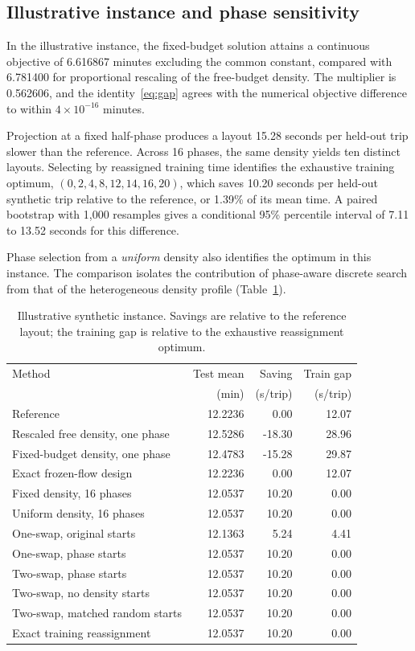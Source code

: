 \documentclass[11pt]{article}
\theoremstyle{remark}\newtheorem{remark}[theorem]{Remark}
\begin{document}
\subsection{Illustrative instance and phase sensitivity}
In the illustrative instance, the fixed-budget solution attains a continuous objective of 6.616867 minutes excluding the common constant, compared with 6.781400 for proportional rescaling of the free-budget density. The multiplier is 0.562606, and the identity~\eqref{eq:gap} agrees with the numerical objective difference to within $4\times10^{-16}$ minutes.

Projection at a fixed half-phase produces a layout 15.28 seconds per held-out trip slower than the reference. Across 16 phases, the same density yields ten distinct layouts. Selecting by reassigned training time identifies the exhaustive training optimum, $(0,2,4,8,12,14,16,20)$, which saves 10.20 seconds per held-out synthetic trip relative to the reference, or 1.39\% of its mean time. A paired bootstrap with 1,000 resamples gives a conditional 95\% percentile interval of 7.11 to 13.52 seconds for this difference.

Phase selection from a \emph{uniform} density also identifies the optimum in this instance. The comparison isolates the contribution of phase-aware discrete search from that of the heterogeneous density profile (Table~\ref{tab:case}).

\begin{table}[htbp]\centering\small
\caption{Illustrative synthetic instance. Savings are relative to the reference layout; the training gap is relative to the exhaustive reassignment optimum.}\label{tab:case}
\begin{tabular}{@{}p{3.23in}rrr@{}}\toprule
Method & Test mean & Saving & Train gap\\
 & (min) & (s/trip) & (s/trip)\\\midrule
Reference & 12.2236 & 0.00 & 12.07 \\
Rescaled free density, one phase & 12.5286 & -18.30 & 28.96 \\
Fixed-budget density, one phase & 12.4783 & -15.28 & 29.87 \\
Exact frozen-flow design & 12.2236 & 0.00 & 12.07 \\
Fixed density, 16 phases & 12.0537 & 10.20 & 0.00 \\
Uniform density, 16 phases & 12.0537 & 10.20 & 0.00 \\
One-swap, original starts & 12.1363 & 5.24 & 4.41 \\
One-swap, phase starts & 12.0537 & 10.20 & 0.00 \\
Two-swap, phase starts & 12.0537 & 10.20 & 0.00 \\
Two-swap, no density starts & 12.0537 & 10.20 & 0.00 \\
Two-swap, matched random starts & 12.0537 & 10.20 & 0.00 \\
Exact training reassignment & 12.0537 & 10.20 & 0.00 \\
\bottomrule\end{tabular}
\end{table}
\end{document}
